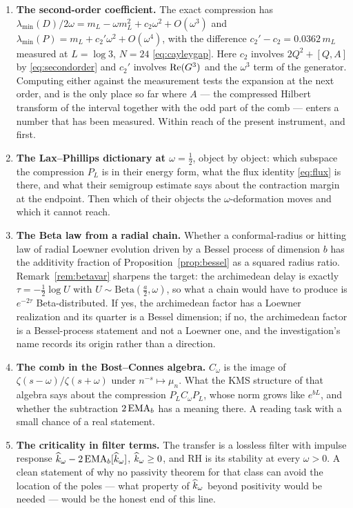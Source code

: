 \begin{enumerate}
\item \textbf{The second-order coefficient.} The exact compression has
$\lambda_{\min}(D)/2\omega=m_L-\omega m_L^2+c_2\omega^2+O(\omega^3)$ and
$\lambda_{\min}(P)=m_L+c_2'\omega^2+O(\omega^4)$, with the difference
$c_2'-c_2=0.0362\,m_L$ measured at $L=\log3$, $N=24$ \eqref{eq:cayleygap}. Here
$c_2$ involves $2Q^2+[Q,A]$ by \eqref{eq:secondorder} and $c_2'$ involves
$\operatorname{Re}(G^3)$ and the $\omega^3$ term of the generator. Computing either against
the measurement tests the expansion at the next order, and is the only place so
far where $A$ --- the compressed Hilbert transform of the interval together with
the odd part of the comb --- enters a number that has been measured. Within
reach of the present instrument, and first.
\item \textbf{The Lax--Phillips dictionary at $\omega=\frac12$}, object by
object: which subspace the compression $P_L$ is in their energy form, what the
flux identity \eqref{eq:flux} is there, and what their semigroup estimate says
about the contraction margin at the endpoint. Then which of their objects the
$\omega$-deformation moves and which it cannot reach.
\item \textbf{The Beta law from a radial chain.} Whether a conformal-radius or
hitting law of radial Loewner evolution driven by a Bessel process of dimension
$b$ has the additivity fraction of Proposition~\ref{prop:bessel} as a squared
radius ratio. Remark~\ref{rem:betavar} sharpens the target: the archimedean
delay is exactly $\tau=-\frac12\log U$ with $U\sim\mathrm{Beta}(\frac a2,\omega)$,
so what a chain would have to produce is $e^{-2\tau}$ Beta-distributed. If yes,
the archimedean factor has a Loewner realization and its quarter is a Bessel
dimension; if no, the archimedean factor is a Bessel-process statement and not a
Loewner one, and the investigation's name records its origin rather than a
direction.
\item \textbf{The comb in the Bost--Connes algebra.} $C_\omega$ is the image of
$\zeta(s-\omega)/\zeta(s+\omega)$ under $n^{-s}\mapsto\mu_n$. What the KMS
structure of that algebra says about the compression $P_LC_\omega P_L$, whose
norm grows like $e^{bL}$, and whether the subtraction $2\operatorname{EMA}_b$ has a meaning
there. A reading task with a small chance of a real statement.
\item \textbf{The criticality in filter terms.} The transfer is a lossless
filter with impulse response $\widehat k_\omega-2\operatorname{EMA}_b[\widehat k_\omega]$, $\widehat k_\omega\geq0$,
and RH is its stability at every $\omega>0$. A clean statement of why no
passivity theorem for that class can avoid the location of the poles --- what
property of $\widehat k_\omega$ beyond positivity would be needed --- would be the
honest end of this line.
\end{enumerate}

